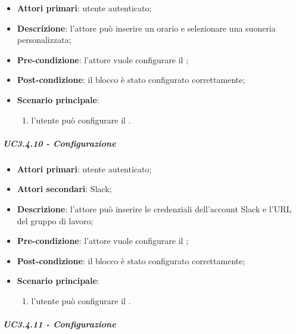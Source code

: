 \begin{itemize}
\item \textbf{Attori primari}: utente autenticato;

\item \textbf{Descrizione}: l'attore può inserire un orario e selezionare una suoneria personalizzata;

\item \textbf{Pre-condizione}: l'attore vuole configurare il \BSveglia{};

\item \textbf{Post-condizione}:  il blocco è stato configurato correttamente;

\item \textbf{Scenario principale}:
\begin{enumerate}
\item  l'utente può configurare il \BSveglia{}.

\end{enumerate}
\end{itemize}

\subparagraph{UC3.4.10 - Configurazione \BSlack{}}

\begin{itemize}
\item \textbf{Attori primari}: utente autenticato;

\item \textbf{Attori secondari}: Slack;

\item \textbf{Descrizione}: l'attore può inserire le credenziali dell'account Slack e l'URL del gruppo di lavoro;

\item \textbf{Pre-condizione}: l'attore vuole configurare il \BSlack{};

\item \textbf{Post-condizione}:  il blocco è stato configurato correttamente;

\item \textbf{Scenario principale}:
\begin{enumerate}
\item  l'utente può configurare il \BSlack{}.

\end{enumerate}
\end{itemize}

\subparagraph{UC3.4.11 - Configurazione \BTelegram{}}

